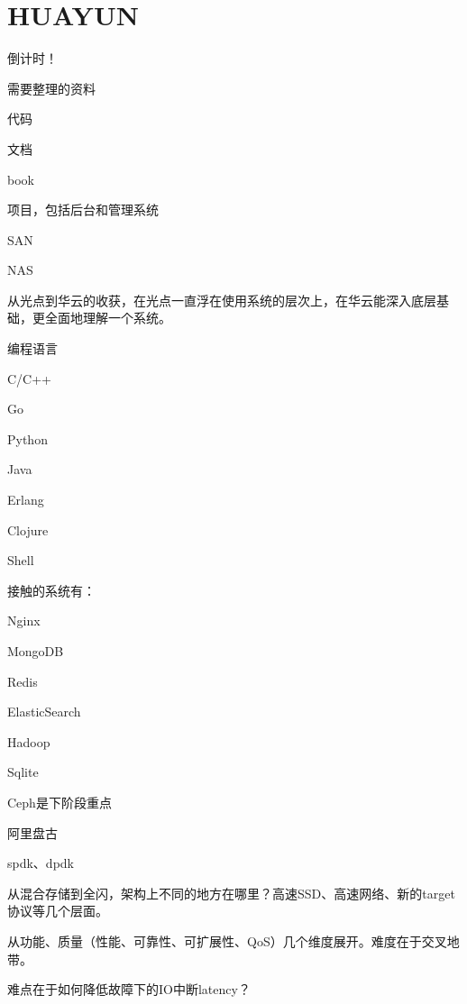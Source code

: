 \chapter{HUAYUN}

倒计时！

需要整理的资料
\begin{enumbox}
\item 代码
\item 文档
\item book
\end{enumbox}

项目，包括后台和管理系统
\begin{enumbox}
\item SAN
\item NAS
\end{enumbox}

从光点到华云的收获，在光点一直浮在使用系统的层次上，在华云能深入底层基础，更全面地理解一个系统。

编程语言
\begin{enumbox}
\item C/C++
\item Go
\item Python
\item Java
\item Erlang
\item Clojure
\item Shell
\end{enumbox}

接触的系统有：
\begin{enumbox}
\item Nginx
\item MongoDB
\item Redis
\item ElasticSearch
\item Hadoop
\item Sqlite
\item Ceph是下阶段重点
\item 阿里盘古
\item spdk、dpdk
\end{enumbox}

从混合存储到全闪，架构上不同的地方在哪里？高速SSD、高速网络、新的target协议等几个层面。

从功能、质量（性能、可靠性、可扩展性、QoS）几个维度展开。难度在于交叉地带。

难点在于如何降低故障下的IO中断latency？
